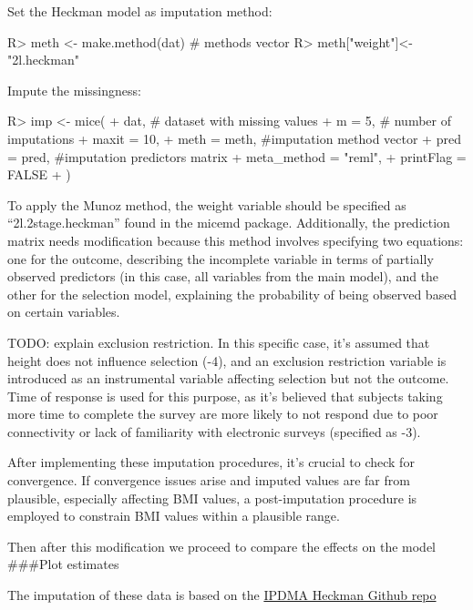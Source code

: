 \documentclass[
]{jss}
\begin{document}
Set the Heckman model as imputation method:

\begin{CodeChunk}
\begin{CodeInput}
R> meth <- make.method(dat) # methods vector
R> meth["weight"]<-"2l.heckman"
\end{CodeInput}
\end{CodeChunk}

Impute the missingness:

\begin{CodeChunk}
\begin{CodeInput}
R> imp <- mice(
+   dat, # dataset with missing values
+   m = 5, # number of imputations
+   maxit = 10,
+   meth = meth, #imputation method vector
+   pred = pred, #imputation predictors matrix
+   meta_method = "reml",
+   printFlag = FALSE
+ )
\end{CodeInput}
\end{CodeChunk}

To apply the Munoz method, the weight variable should be specified as
``2l.2stage.heckman'' found in the micemd package. Additionally, the
prediction matrix needs modification because this method involves
specifying two equations: one for the outcome, describing the incomplete
variable in terms of partially observed predictors (in this case, all
variables from the main model), and the other for the selection model,
explaining the probability of being observed based on certain variables.

TODO: explain exclusion restriction. In this specific case, it's assumed
that height does not influence selection (-4), and an exclusion
restriction variable is introduced as an instrumental variable affecting
selection but not the outcome. Time of response is used for this
purpose, as it's believed that subjects taking more time to complete the
survey are more likely to not respond due to poor connectivity or lack
of familiarity with electronic surveys (specified as -3).

After implementing these imputation procedures, it's crucial to check
for convergence. If convergence issues arise and imputed values are far
from plausible, especially affecting BMI values, a post-imputation
procedure is employed to constrain BMI values within a plausible range.

Then after this modification we proceed to compare the effects on the
model \#\#\#Plot estimates

The imputation of these data is based on the
\href{https://github.com/johamunoz/Heckman-IPDMA/blob/main/Toy_example.R}{IPDMA
Heckman Github repo}
\end{document}
